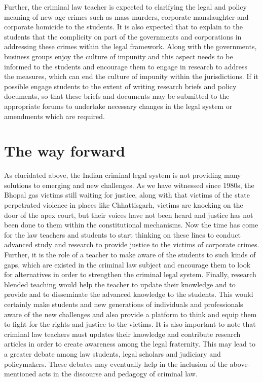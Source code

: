 \begin{multicols}{2}
\noi
Further, the criminal law teacher is expected to clarifying the legal and policy
meaning of new age crimes such as mass murders, corporate manslaughter and
corporate homicide to the students. It is also expected that to explain to the
students that the complicity on part of the governments and corporations in
addressing these crimes within the legal framework. Along with the governments,
business groups enjoy the culture of impunity and this aspect needs to be informed
to the students and encourage them to engage in research to address the measures,
which can end the culture of impunity within the jurisdictions. If it possible engage
students to the extent of writing research briefs and policy documents, so that these
briefs and documents may be submitted to the appropriate forums to undertake
necessary changes in the legal system or amendments which are required.

\vspace{-.3cm}

\section{The way forward}\label{section-4}

\vspace{-.2cm}

\noi
As elucidated above, the Indian criminal legal system is not providing many
solutions to emerging and new challenges. As we have witnessed since 1980s, the
Bhopal gas victims still waiting for justice, along with that victims of the state
perpetrated violence in places like Chhattisgarh, victims are knocking on the door
of the apex court, but their voices have not been heard and justice has not been
done to them within the constitutional mechanisms. Now the time has come for the
law teachers and students to start thinking on these lines to conduct advanced study
and research to provide justice to the victims of corporate crimes. Further, it is the
role of a teacher to make aware of the students to such kinds of gaps, which are
existed in the criminal law subject and encourage them to look for alternatives in
order to strengthen the criminal legal system. Finally, research blended teaching
would help the teacher to update their knowledge and to provide and to
disseminate the advanced knowledge to the students. This would certainly make
students and new generations of individuals and professionals aware of the new
challenges and also provide a platform to think and equip them to fight for the
rights and justice to the victims. It is also important to note that criminal law
teachers must updates their knowledge and contribute research articles in order to
create awareness among the legal fraternity. This may lead to a greater debate
among law students, legal scholars and judiciary and policymakers. These debates
may eventually help in the inclusion of the above-mentioned acts in the discourse
and pedagogy of criminal law.



\end{multicols}
